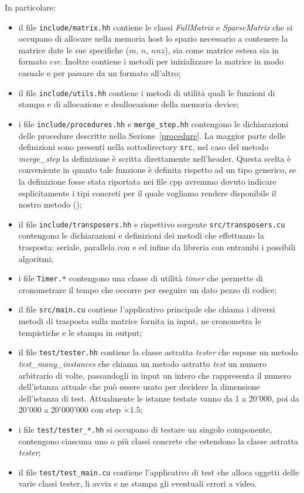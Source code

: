 In particolare:
\begin{itemize}
    \item il file \texttt{include/matrix.hh} contiene le classi \emph{FullMatrix} e \emph{SparseMatrix} che si occupano di allocare nella memoria host lo spazio necessario a contenere la matrice date le sue specifiche ($m$, $n$, $nnz$), sia come matrice estesa sia in formato \emph{csr}. Inoltre contiene i metodi per inizializzare la matrice in modo casuale e per passare da un formato all'altro;
    \item il file \texttt{include/utils.hh} contiene i metodi di utilità quali le funzioni di stampa e di allocazione e deallocazione della memoria device;
    \item i file \texttt{include/procedures.hh} e \texttt{merge\_step.hh} contengono le dichiarazioni delle procedure descritte nella Sezione~\ref{procedure}. La maggior parte delle definizioni sono presenti nella sottodirectory \texttt{src}, nel caso del metodo \emph{merge\_step} la definizione è scritta direttamente nell'header. Questa scelta è conveniente in quanto tale funzione è definita rispetto ad un tipo generico, se la definizione fosse stata riportata nei file cpp avremmo dovuto indicare esplicitamente i tipi concreti per il quale vogliamo rendere disponibile il nostro metodo (\cite{template});
    \item il file \texttt{include/transposers.hh} e rispettivo sorgente \texttt{src/transposers.cu} contengono le dichiarazioni e definizioni dei metodi che effettuano la trasposta: seriale, parallela con \ScanTrans{} e \MergeTrans{} ed infine da libreria \cuSPARSE{} con entrambi i possibili algoritmi;
    \item i file \texttt{Timer.*} contengono una classe di utilità \emph{timer} che permette di cronometrare il tempo che occorre per eseguire un dato pezzo di codice;
    \item il file \texttt{src/main.cu} contiene l'applicativo principale che chiama i diversi metodi di trasposta sulla matrice fornita in input, ne cronometra le tempistiche e le stampa in output;
    \item il file \texttt{test/tester.hh} contiene la classe astratta \emph{tester} che espone un metodo \emph{test\_many\_instances} che chiama un metodo astratto \emph{test} un numero arbitrario di volte, passandogli in input un intero che rappresenta il numero dell'istanza attuale che può essere usato per decidere la dimensione dell'istanza di test. Attualmente le istanze testate vanno da 1 a 20'000, poi da 20'000 a 20'000'000 con step $\times 1.5$; 
    \item i file \texttt{test/tester\_*.hh} si occupano di testare un singolo componente, contengono ciascuna uno o più classi concrete che estendono la classe astratta \emph{tester};
    \item il file \texttt{test/test\_main.cu} contiene l'applicativo di test che alloca oggetti delle varie classi tester, li avvia e ne stampa gli eventuali errori a video.
\end{itemize}
	
